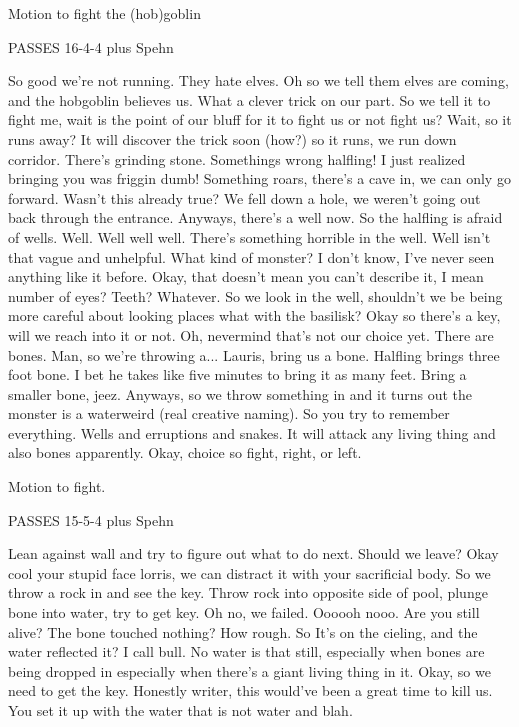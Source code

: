 \documentclass[10pt]{article}
\newcommand{\ps}{ plus Spehn\xspace}
\begin{document}
Motion to fight the (hob)goblin

PASSES 16-4-4\ps

So good we're not running. They hate elves. Oh so we tell them elves are coming, and the hobgoblin believes us. What a clever trick on our part. So we tell it to fight me, wait is the point of our bluff for it to fight us or not fight us? Wait, so it runs away? It will discover the trick soon (how?) so it runs, we run down corridor. There's grinding stone.
Somethings wrong halfling! I just realized bringing you was friggin dumb! Something roars, there's a cave in, we can only go forward. Wasn't this already true? We fell down a hole, we weren't going out back through the entrance. Anyways, there's a well now. So the halfling is afraid of wells. Well. Well well well. There's something horrible in the well. Well isn't that vague and unhelpful. 
What kind of monster? I don't know, I've never seen anything like it before. Okay, that doesn't mean you can't describe it, I mean number of eyes? Teeth? Whatever. So we look in the well, shouldn't we be being more careful about looking places what with the basilisk? Okay so there's a key, will we reach into it or not. Oh, nevermind that's not our choice yet. There are bones. Man, so we're throwing a...
Lauris, bring us a bone. Halfling brings three foot bone. I bet he takes like five minutes to bring it as many feet. Bring a smaller bone, jeez. Anyways, so we throw something in and it turns out the monster is a waterweird (real creative naming). So you try to remember everything. Wells and erruptions and snakes. It will attack any living thing and also bones apparently. Okay, choice so fight, right, or left.

Motion to fight.

PASSES 15-5-4\ps

Lean against wall and try to figure out what to do next. Should we leave? Okay cool your stupid face lorris, we can distract it with your sacrificial body. So we throw a rock in and see the key. Throw rock into opposite side of pool, plunge bone into water, try to get key. Oh no, we failed. Oooooh nooo. Are you still alive? The bone touched nothing? How rough. So It's on the cieling, and the water reflected it? I call bull. No water is that still, especially when bones are being dropped in especially when there's a giant living thing in it. Okay, so we need to get the key. Honestly writer, this would've been a great time to kill us. You set it up with the water that is not water and blah. 
\end{document}
